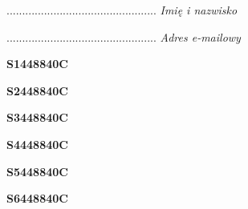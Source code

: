 \begin{turn}{90}\begin{minipage}{\linewidth} \vspace{20mm} ................................................  \textit{Imię i nazwisko}\end{minipage}\end{turn}

\begin{turn}{90}\begin{minipage}{\linewidth} \vspace{20mm} ................................................  \textit{Adres e-mailowy}\end{minipage}\end{turn}

\begin{turn}{90}\huge \begin{minipage}{\linewidth} \vspace{10mm}\textbf{S1448840C}\end{minipage}\end{turn}

\begin{turn}{90}\huge \begin{minipage}{\linewidth} \vspace{10mm}\textbf{S2448840C}\end{minipage}\end{turn}

\begin{turn}{90}\huge \begin{minipage}{\linewidth} \vspace{10mm}\textbf{S3448840C}\end{minipage}\end{turn}

\begin{turn}{90}\huge \begin{minipage}{\linewidth} \vspace{10mm}\textbf{S4448840C}\end{minipage}\end{turn}

\begin{turn}{90}\huge \begin{minipage}{\linewidth} \vspace{10mm}\textbf{S5448840C}\end{minipage}\end{turn}

\begin{turn}{90}\huge \begin{minipage}{\linewidth} \vspace{10mm}\textbf{S6448840C}\end{minipage}\end{turn}


